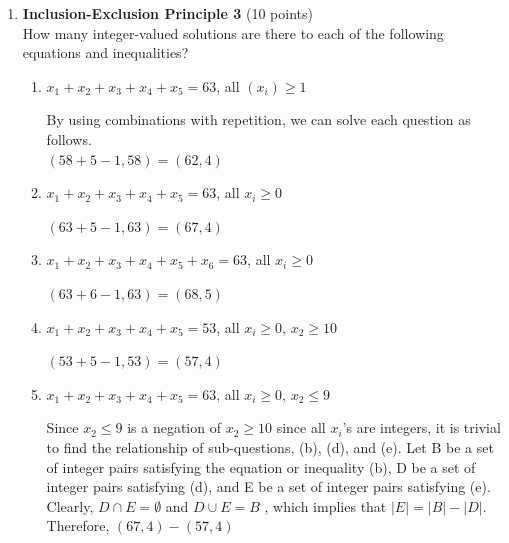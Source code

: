 \begin{enumerate}
  \item \textbf{Inclusion-Exclusion Principle 3} (10 points)\\
  How many integer-valued solutions are there to each of the following equations and inequalities?
  \begin{enumerate}[label=\alph*.]
    \item $x_1+x_2+x_3+x_4+x_5=63$, all $(x_i) \geq 1$
    \begin{subanswer}[red][true]
      By using combinations with repetition, we can solve each question as follows. \\
      $(58+5-1,58)=(62,4)$
    \end{subanswer}
    \item $x_1+x_2+x_3+x_4+x_5=63$, all $x_i \geq 0$
    \begin{subanswer}[red][true]
      $(63+5-1,63)=(67,4)$
    \end{subanswer}
    \item $x_1+x_2+x_3+x_4+x_5+x_6=63$, all $x_i \geq 0$
    \begin{subanswer}[red][true]
      $(63+6-1,63)=(68,5)$
    \end{subanswer}
    \item $x_1+x_2+x_3+x_4+x_5=53$, all $x_i \geq 0$, $x_2 \geq 10$
    \begin{subanswer}[red][true]
      $(53+5-1,53)=(57,4)$
    \end{subanswer}
    \item $x_1+x_2+x_3+x_4+x_5=63$, all $x_i \geq 0$, $x_2 \leq 9$
    \begin{subanswer}[red][true]
      Since $x_2 \leq 9$ is a negation of $x_2 \geq 10$ since all $x_i$'s 
      are integers, it is trivial to find the relationship of sub-questions, 
      (b), (d), and (e). Let B be a set of integer pairs satisfying the equation 
      or inequality (b), D be a set of integer pairs satisfying (d), and E be 
      a set of integer pairs satisfying (e). Clearly,
      $D \cap E = \emptyset$
      and
      $D \cup E = B$
      , which implies that $|E|=|B|-|D|$. Therefore,
      $(67,4)-(57,4)$
    \end{subanswer}
  \end{enumerate}



  \newpage



\end{enumerate}
